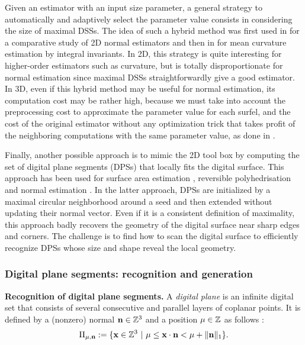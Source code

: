 Given an estimator with an input size parameter, a general strategy to automatically and adaptively select
the parameter value consists in considering the size of maximal DSSs. 
The idea of such a hybrid method was first used in \cite{Devieilleville2009}
for a comparative study of 2D normal estimators and then in \cite{Coeurjolly2014IIfree}
for mean curvature estimation by integral invariants.
In 2D, this strategy is quite interesting for higher-order estimators such as curvature,
but is totally disproportionate for normal estimation since maximal DSSs straightforwardly give a good estimator. 
In 3D, even if this hybrid method may be useful for normal estimation, its computation cost may be rather high,
because we must take into account the preprocessing cost to approximate the parameter value for each surfel,
and the cost of the original estimator without any optimization trick that takes profit of the neighboring
computations with the same parameter value, as done in \cite{Lachaud2017}. 

Finally, another possible approach is to mimic the 2D tool box by computing the set of
digital plane segments (DPSs) that locally fits the digital surface. This approach
has been used for surface area estimation \cite{Klette2001}, reversible polyhedrisation
\cite{Sivignon2004} and normal estimation \cite{Charrier2011}. In the latter approach,
DPSs are initialized by a maximal circular neighborhood around a seed and then extended
without updating their normal vector. Even if it is a consistent definition of maximality,
this approach badly recovers the geometry of the digital surface near sharp edges and corners. 
The challenge is to find how to scan the digital surface to efficiently recognize DPSs
whose size and shape reveal the local geometry. 

\subsubsection{Digital plane segments: recognition and generation}
\label{sec:dps}

\noindent\textbf{Recognition of digital plane segments.}
A \emph{digital plane} is an infinite digital set that 
consists of several consecutive and parallel layers of coplanar points. 
It is defined by a (nonzero) normal $\mathbf{n} \in {\ensuremath\mathbb{Z}}^3$ and a position $\mu \in {\ensuremath\mathbb{Z}}$ as follows
\cite{reveilles1991}:  
\begin{equation}
  \label{eq:plane}
\Pi_{\mu,\mathbf{n}} := \{ \mathbf{x} \in {\ensuremath\mathbb{Z}}^3 \ | \ \mu \leq \mathbf{x} \cdot \mathbf{n} < \mu + \|\mathbf{n}\|_1 \}.
\end{equation}

